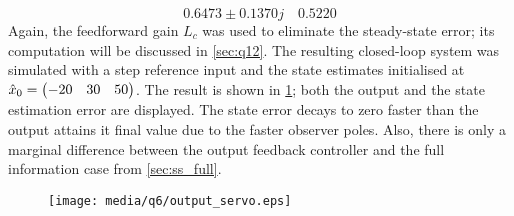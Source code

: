 $$0.6473 \pm 0.1370j \quad  0.5220$$
Again, the feedforward gain $L_c$ was used to eliminate the steady-state error; its computation will be discussed in \cref{sec:q12}. The resulting closed-loop system was simulated with a step reference input and the state estimates initialised at $\hat{x}_0 = \mqty(-20 & 30 & 50)$. The result is shown in \cref{fig:q6_output_servo}; both the output and the state estimation error are displayed. The state error decays to zero faster than the output attains it final value due to the faster observer poles. Also, there is only a marginal difference between the output feedback controller and the full information case from \cref{sec:ss_full}.
\begin{figure}[ht!]
    \centering
    \texttt{[image: media/q6/output\_servo.eps]}
    \caption{}
    \label{fig:q6_output_servo}
\end{figure}

